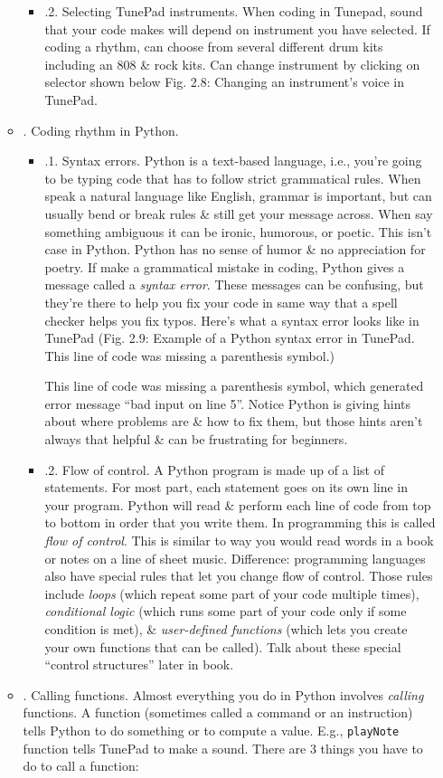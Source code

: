 \documentclass{article}
\begin{document}
\begin{itemize}
\begin{itemize}
\begin{itemize}
			\item {.2. Selecting TunePad instruments.} When coding in Tunepad, sound that your code makes will depend on instrument you have selected. If coding a rhythm, can choose from several different drum kits including an 808 \& rock kits. Can change instrument by clicking on selector shown below {\sf Fig. 2.8: Changing an instrument's voice in TunePad.}
		\end{itemize}
		\item {. Coding rhythm in Python.}
		\begin{itemize}
			\item {.1. Syntax errors.} Python is a text-based language, i.e., you're going to be typing code that has to follow strict grammatical rules. When speak a natural language like English, grammar is important, but can usually bend or break rules \& still get your message across. When say something ambiguous it can be ironic, humorous, or poetic. This isn't case in Python. Python has no sense of humor \& no appreciation for poetry. If make a grammatical mistake in coding, Python gives a message called a {\it syntax error}. These messages can be confusing, but they're there to help you fix your code in same way that a spell checker helps you fix typos. Here's what a syntax error looks like in TunePad ({\sf Fig. 2.9: Example of a Python syntax error in TunePad. This line of code was missing a parenthesis symbol.})
			
			This line of code was missing a parenthesis symbol, which generated error message ``bad input on line 5''. Notice Python is giving hints about where problems are \& how to fix them, but those hints aren't always that helpful \& can be frustrating for beginners.
			\item {.2. Flow of control.} A Python program is made up of a list of statements. For most part, each statement goes on its own line in your program. Python will read \& perform each line of code from top to bottom in order that you write them. In programming this is called {\it flow of control}. This is similar to way you would read words in a book or notes on a line of sheet music. Difference: programming languages also have special rules that let you change flow of control. Those rules include {\it loops} (which repeat some part of your code multiple times), {\it conditional logic} (which runs some part of your code only if some condition is met), \& {\it user-defined functions} (which lets you create your own functions that can be called). Talk about these special ``control structures'' later in book.
		\end{itemize}
		\item {. Calling functions.} Almost everything you do in Python involves {\it calling} functions. A function (sometimes called a command or an instruction) tells Python to do something or to compute a value. E.g., {\tt playNote} function tells TunePad to make a sound. There are 3 things you have to do to call a function:
		

\end{itemize}
\end{itemize}
\end{document}
